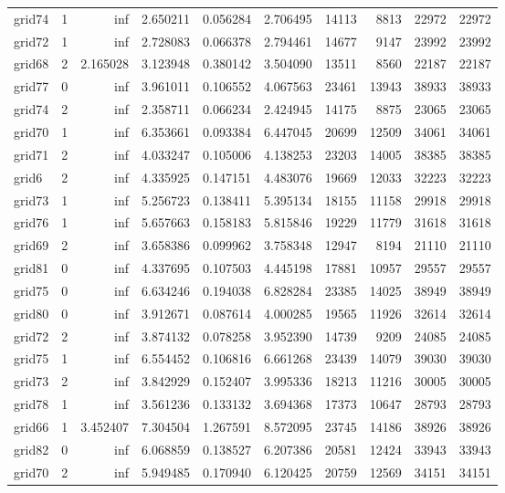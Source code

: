 \begin{longtable}{|l|r|r|r|r|r|r|r|r|r|}
grid74 & 1 & inf & 2.650211 & 0.056284 & 2.706495 & 14113 & 8813 & 22972 & 22972 \\
grid72 & 1 & inf & 2.728083 & 0.066378 & 2.794461 & 14677 & 9147 & 23992 & 23992 \\
grid68 & 2 & 2.165028 & 3.123948 & 0.380142 & 3.504090 & 13511 & 8560 & 22187 & 22187 \\
grid77 & 0 & inf & 3.961011 & 0.106552 & 4.067563 & 23461 & 13943 & 38933 & 38933 \\
grid74 & 2 & inf & 2.358711 & 0.066234 & 2.424945 & 14175 & 8875 & 23065 & 23065 \\
grid70 & 1 & inf & 6.353661 & 0.093384 & 6.447045 & 20699 & 12509 & 34061 & 34061 \\
grid71 & 2 & inf & 4.033247 & 0.105006 & 4.138253 & 23203 & 14005 & 38385 & 38385 \\
grid6 & 2 & inf & 4.335925 & 0.147151 & 4.483076 & 19669 & 12033 & 32223 & 32223 \\
grid73 & 1 & inf & 5.256723 & 0.138411 & 5.395134 & 18155 & 11158 & 29918 & 29918 \\
grid76 & 1 & inf & 5.657663 & 0.158183 & 5.815846 & 19229 & 11779 & 31618 & 31618 \\
grid69 & 2 & inf & 3.658386 & 0.099962 & 3.758348 & 12947 & 8194 & 21110 & 21110 \\
grid81 & 0 & inf & 4.337695 & 0.107503 & 4.445198 & 17881 & 10957 & 29557 & 29557 \\
grid75 & 0 & inf & 6.634246 & 0.194038 & 6.828284 & 23385 & 14025 & 38949 & 38949 \\
grid80 & 0 & inf & 3.912671 & 0.087614 & 4.000285 & 19565 & 11926 & 32614 & 32614 \\
grid72 & 2 & inf & 3.874132 & 0.078258 & 3.952390 & 14739 & 9209 & 24085 & 24085 \\
grid75 & 1 & inf & 6.554452 & 0.106816 & 6.661268 & 23439 & 14079 & 39030 & 39030 \\
grid73 & 2 & inf & 3.842929 & 0.152407 & 3.995336 & 18213 & 11216 & 30005 & 30005 \\
grid78 & 1 & inf & 3.561236 & 0.133132 & 3.694368 & 17373 & 10647 & 28793 & 28793 \\
grid66 & 1 & 3.452407 & 7.304504 & 1.267591 & 8.572095 & 23745 & 14186 & 38926 & 38926 \\
grid82 & 0 & inf & 6.068859 & 0.138527 & 6.207386 & 20581 & 12424 & 33943 & 33943 \\
grid70 & 2 & inf & 5.949485 & 0.170940 & 6.120425 & 20759 & 12569 & 34151 & 34151 \\

\end{longtable}
